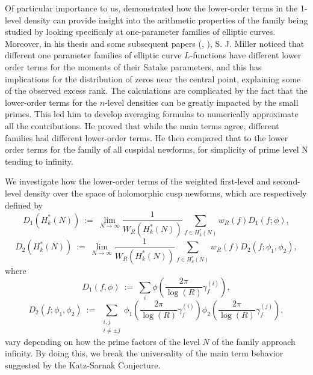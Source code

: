 \documentclass[11pt, reqno]{amsart}
\theoremstyle{definition}
\theoremstyle{remark}
\numberwithin{equation}{section}
\begin{document}
Of particular importance to us,  \cite{Miller2009_LOTerms_1LevelDensity} demonstrated how the lower-order terms in the 1-level density can provide insight into the arithmetic properties of the family being studied by looking specificaly at one-parameter families of elliptic curves. Moreover, in his thesis \cite{Mil2} and some subsequent papers (\cite{Miller2005}, \cite{Miller2009_LOTerms_1LevelDensity}), S. J. Miller noticed that different one parameter families of elliptic curve $L$-functions have different lower order terms for the moments of their Satake parameters, and this has implications for the distribution of zeros near the central point, explaining some of the observed excess rank. The calculations are complicated by the fact that the lower-order terms for the $n$-level densities can be greatly impacted by the small primes. This led him to develop averaging formulas to numerically approximate all the contributions. He proved that while the main terms agree, different families had different lower-order terms. He then compared that to the lower order terms for the family of all cuspidal newforms, for simplicity of prime level N tending to infinity.

We investigate how the lower-order terms of the weighted first-level and second-level density over the space of holomorphic cusp newforms, which are respectively defined by
\begin{equation}\label{eq:2ndlvl-density-def}
     D_1(H_k^*(N))\ :=\ \lim_{N\to \infty}\frac{1}{W_R(H_k^*(N))}\sum_{f \in H_k^*(N)}w_R(f)D_1(f ; \phi),
\end{equation}
\begin{equation}\label{eq:2ndlvl-density-def-2}
     D_2(H_k^*(N))\ :=\ \lim_{N\to \infty}\frac{1}{W_R(H_k^*(N))}\sum_{f \in H_k^*(N)}w_R(f)D_2(f ;  \phi_1,\phi_2),
\end{equation}where
\begin{equation}
    D_1(f, \phi) \ :=\ \displaystyle\sum_{i}\phi\left(\frac{2\pi}{\log(R) }\gamma_f^{(i)}\right),
\end{equation}
\begin{equation}
D_2(f; \phi_1,\phi_2)\ :=\ \sum_{\substack{i,j\\i \neq \pm j}}\phi_1 \left( \frac{2\pi}{\log(R)} \gamma_f^{(i)} \right)\phi_2 \left( \frac{2\pi}{\log(R)} \gamma_f^{(j)} \right),
\end{equation} 
vary depending on how the prime factors of the level $N$ of the family approach infinity. By doing this, we break the universality of the main term behavior suggested by the Katz-Sarnak Conjecture.
\end{document}
